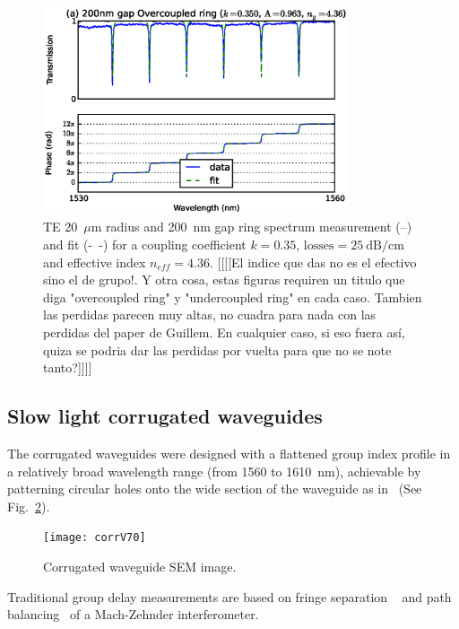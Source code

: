 \documentclass[journal]{IEEEtran}
\begin{document}
\begin{figure}[htb]
  \centerline{\includegraphics[width=9cm]{r20g200TE_fitPhaseAmp}}
  \caption{TE 20~$\mu$m radius and 200~nm gap ring spectrum measurement (--) and fit (-~-) for a coupling coefficient $k=0.35$, $\mathrm{losses=25~dB/cm}$ and effective index $n_{eff}=4.36$. [[[[El indice que das no es el efectivo sino el de grupo!. Y otra cosa, estas figuras requiren un titulo que diga "overcoupled ring" y "undercoupled ring" en cada caso. Tambien las perdidas parecen muy altas, no cuadra para nada con las perdidas del paper de Guillem. En cualquier caso, si eso fuera así, quiza se podria dar las perdidas por vuelta para que no se note tanto?]]]]}
  \label{fig:overcoupled} %
\end{figure}



\subsection{Slow light corrugated waveguides}
\label{sec:corrWaveguides}
The corrugated waveguides were designed with a flattened group index profile in a relatively broad wavelength range (from 1560 to 1610~nm), achievable by patterning circular holes onto the wide section of the waveguide as in~\cite{Brimont2010} (See Fig.~\ref{fig:sem}).

\begin{figure}[htb]
	\centering
	\texttt{[image: corrV70]}	
	\caption{Corrugated waveguide SEM image.}
	\label{fig:sem}
 \end{figure}


Traditional group delay measurements are based on fringe separation ~\cite{shang81,vlasov:05,yao:811,Dulkeith2006} and path balancing~\cite{Cohen:82,Knox:88,Liang:98} of a Mach-Zehnder interferometer.
\end{document}
